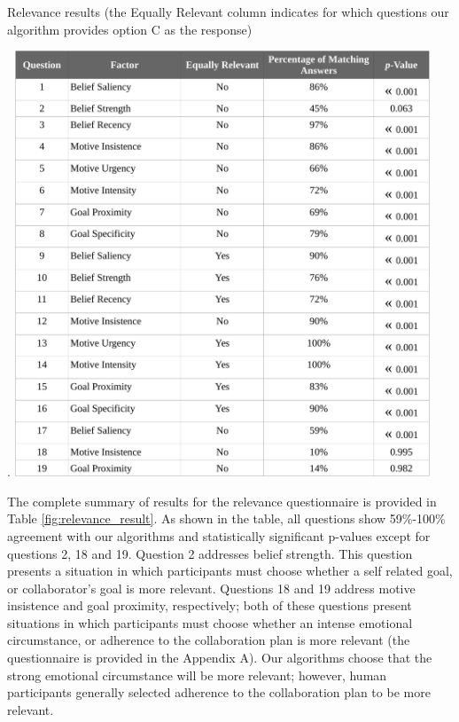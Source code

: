 \documentclass[12pt]{report}
\begin{document}
\begin{table}[tbh]
  \centering
  \caption{Relevance results (the Equally Relevant column indicates
  for which questions our algorithm provides option C as the response)}.
  \label{fig:relevance_result}
  \vspace*{-3mm}
  \includegraphics[width=0.93\textwidth]{figure/relevance_result_croped.pdf}
\end{table}

The complete summary of results for the relevance questionnaire is provided in
Table \ref{fig:relevance_result}. As shown in the table, all questions show
59\%-100\% agreement with our algorithms and statistically significant p-values
except for questions 2, 18 and 19. Question 2 addresses belief strength.
This question presents a situation in which participants must
choose whether a self related goal, or collaborator's goal is more relevant.
Questions 18 and 19 address motive insistence and goal proximity, respectively;
both of these questions present situations in which participants must choose
whether an intense emotional circumstance, or adherence to the collaboration
plan is more relevant (the questionnaire is provided in the Appendix A). Our
algorithms choose that the strong emotional circumstance will be more relevant;
however, human participants generally selected adherence to the collaboration
plan to be more relevant.
\end{document}
